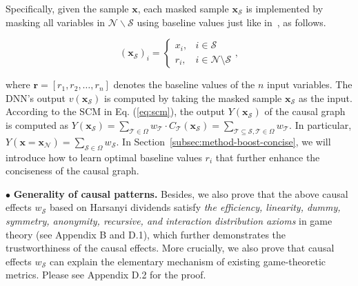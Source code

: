 \documentclass[10pt,twocolumn,letterpaper]{article}
\begin{document}
Specifically, given the sample {\small$\boldsymbol{x}$}, each masked sample {\small$\boldsymbol{x}_{\mathcal{S}}$} is implemented by masking all variables in {\small$\mathcal{N}\backslash \mathcal{S}$} using baseline values just like in~\cite{dabkowski2017real,ancona2019explaining}, as follows.


\vspace{-6pt}
\begin{small}
\begin{equation}
     (\boldsymbol{x}_{\mathcal{S}})_i=
     \left\{
     \begin{array}{ll}
        \!\! x_i,  & i\in \mathcal{S} \\
        \!\! r_i,  & i\in \mathcal{N}\!\setminus\! \mathcal{S}
     \end{array}
     \right.
     ,
     \label{eq:masked-sample}
\end{equation}
\end{small}
\!\!where {\small$\boldsymbol{r}=[r_1, r_2, \ldots, r_n]$} denotes the baseline values of the {\small$n$} input variables.
The DNN's output {\small$v(\boldsymbol{x}_{\mathcal{S}})$} is computed by taking the masked sample {\small$\boldsymbol{x}_{\mathcal{S}}$} as the input.
According to the SCM in Eq. (\ref{eq:scm}), the output {\small$Y(\boldsymbol{x}_{\mathcal{S}})$} of the causal graph is computed as {\small$Y(\boldsymbol{x}_{\mathcal{S}})=\sum_{\mathcal{T}\in\Omega}w_{\mathcal{T}}\cdot C_{\mathcal{T}}(\boldsymbol{x}_{\mathcal{S}})=\sum_{\mathcal{T}\subseteq\mathcal{S},\mathcal{T}\in\Omega}w_{\mathcal{T}}$}.
In particular, {\small$Y(\boldsymbol{x}=\boldsymbol{x}_{\mathcal{N}})=\sum_{\mathcal{S}\in\Omega}w_{\mathcal{S}}$}.
In Section~\ref{subsec:method-boost-concise}, we will introduce how to learn optimal baseline values {\small$r_i$} that further enhance the conciseness of the causal graph.



$\bullet$ \textbf{Generality of causal patterns.} Besides, we also prove that the above causal effects {\small$w_{\mathcal{S}}$} based on Harsanyi dividends satisfy \emph{the efficiency, linearity, dummy, symmetry, anonymity, recursive, and interaction distribution axioms} in game theory (see Appendix B and D.1), which further demonstrates the trustworthiness of the causal effects.
More crucially, we also prove that causal effects {\small$w_{\mathcal{S}}$} can explain the elementary mechanism of existing game-theoretic metrics.
Please see Appendix D.2 for the proof.
\end{document}

